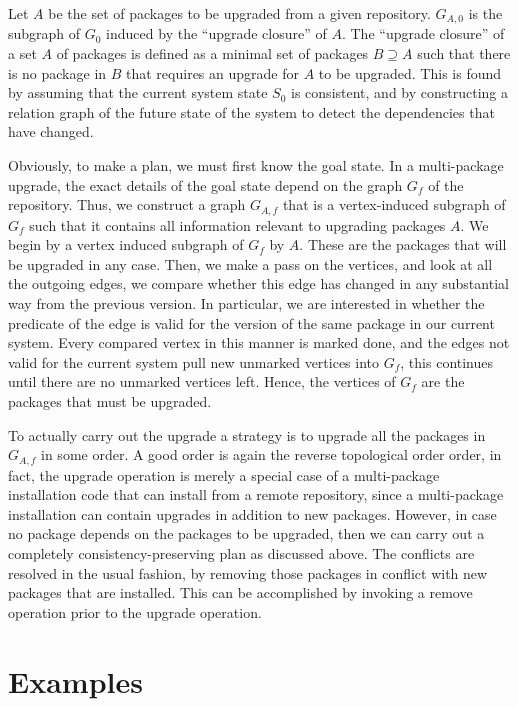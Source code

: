 \documentclass[a4paper,11pt]{article}
\begin{document}
Let $A$ be the set of packages to be upgraded from a given repository.
$G_{A,0}$ is the subgraph of $G_{0}$ induced by the ``upgrade
closure'' of $A$. The ``upgrade closure'' of a set $A$ of packages is
defined as a minimal set of packages $B \supseteq A$ such that there is no
package in $B$ that requires an upgrade for $A$ to be upgraded. This
is found by assuming that the current system state $S_0$ is
consistent, and by constructing a relation graph of the future state
of the system to detect the dependencies that have changed.

Obviously, to make a plan, we must first know the goal state. In a
multi-package upgrade, the exact details of the goal state depend on
the graph $G_f$ of the repository. Thus, we construct a graph
$G_{A,f}$ that is a vertex-induced subgraph of $G_f$ such that it
contains all information relevant to upgrading packages $A$. We begin
by a vertex induced subgraph of $G_f$ by $A$. These are the packages
that will be upgraded in any case. Then, we make a pass on the
vertices, and look at all the outgoing edges, we compare whether this
edge has changed in any substantial way from the previous version. In
particular, we are interested in whether the predicate of the edge is
valid for the version of the same package in our current system. Every
compared vertex in this manner is marked done, and the edges not valid
for the current system pull new unmarked vertices into $G_f$, this
continues until there are no unmarked vertices left. Hence, the
vertices of $G_f$ are the packages that must be upgraded.

To actually carry out the upgrade a strategy is to upgrade all the
packages in $G_{A,f}$ in some order. A good order is again the reverse
topological order order, in fact, the upgrade operation is merely a
special case of a multi-package installation code that can install
from a remote repository, since a multi-package installation can
contain upgrades in addition to new packages. However, in case no
package depends on the packages to be upgraded, then we can carry out
a completely consistency-preserving plan as discussed above. The
conflicts are resolved in the usual fashion, by removing those
packages in conflict with new packages that are installed. This can be
accomplished by invoking a remove operation prior to the upgrade
operation.

\section{Examples}
\end{document}
